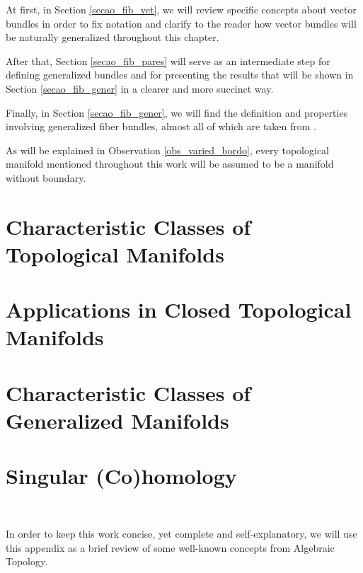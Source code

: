 \documentclass[12pt,oneside]{book}
\begin{document}
    At first, in Section \ref{secao_fib_vet}, we will review specific concepts about vector bundles in 
    order to fix notation and clarify to the reader how vector bundles will be naturally generalized 
    throughout this chapter.

    After that, Section \ref{secao_fib_pares} will serve as an intermediate step for defining generalized 
    bundles and for presenting the results that will be shown in Section \ref{secao_fib_gener} in a 
    clearer and more succinct way.

    Finally, in Section \ref{secao_fib_gener}, we will find the definition and properties involving 
    generalized fiber bundles, almost all of which are taken from \cite{fadell_1}.

    As will be explained in Observation \ref{obs_varied_bordo}, every topological manifold mentioned 
    throughout this work will be assumed to be a manifold without boundary.



    \chapter{Characteristic Classes of Topological Manifolds}\label{cap_clas_carac}
    \thispagestyle{empty}



    \chapter{Applications in Closed Topological Manifolds}\label{cap_aplic}
    \thispagestyle{empty}



    \chapter{Characteristic Classes of Generalized Manifolds}\label{cap_wu_gen}
    \thispagestyle{empty}



    \appendix

    \chapter{Singular (Co)homology}\label{ap_(co)_sing}
    \thispagestyle{empty}

    \

    In order to keep this work concise, yet complete and self-explanatory, we will use this appendix as 
    a brief review of some well-known concepts from Algebraic Topology.
\end{document}
